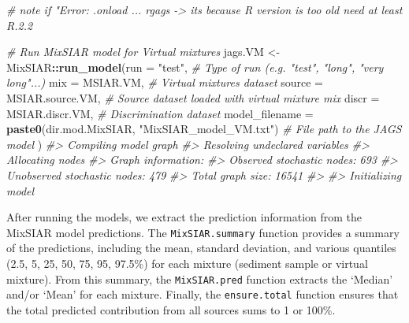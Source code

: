 \documentclass[
]{article}
\newenvironment{Shaded}{\begin{snugshade}}{\end{snugshade}}
\newcommand{\AttributeTok}[1]{\textcolor[rgb]{0.13,0.29,0.53}{#1}}
\newcommand{\CommentTok}[1]{\textcolor[rgb]{0.56,0.35,0.01}{\textit{#1}}}
\newcommand{\FunctionTok}[1]{\textcolor[rgb]{0.13,0.29,0.53}{\textbf{#1}}}
\newcommand{\NormalTok}[1]{#1}
\newcommand{\OtherTok}[1]{\textcolor[rgb]{0.56,0.35,0.01}{#1}}
\newcommand{\SpecialCharTok}[1]{\textcolor[rgb]{0.81,0.36,0.00}{\textbf{#1}}}
\newcommand{\StringTok}[1]{\textcolor[rgb]{0.31,0.60,0.02}{#1}}
\begin{document}
\begin{Shaded}
\begin{Highlighting}[]
\CommentTok{\# note if "Error: .onload ... \textquotesingle{}rgags\textquotesingle{} {-}\textgreater{} it\textquotesingle{}s because R version is too old need at least R.2.2}

\CommentTok{\# Run MixSIAR model for Virtual mixtures}
\NormalTok{jags.VM }\OtherTok{\textless{}{-}}\NormalTok{ MixSIAR}\SpecialCharTok{::}\FunctionTok{run\_model}\NormalTok{(}\AttributeTok{run =} \StringTok{"test"}\NormalTok{,                                                    }\CommentTok{\# Type of run (e.g. "test", "long", "very long"...)}
                              \AttributeTok{mix =}\NormalTok{ MSIAR.VM,                                                  }\CommentTok{\# Virtual mixtures dataset}
                              \AttributeTok{source =}\NormalTok{ MSIAR.source.VM,                                        }\CommentTok{\# Source dataset loaded with virtual mixture mix}
                              \AttributeTok{discr =}\NormalTok{ MSIAR.discr.VM,                                          }\CommentTok{\# Discrimination dataset}
                              \AttributeTok{model\_filename =} \FunctionTok{paste0}\NormalTok{(dir.mod.MixSIAR, }\StringTok{"MixSIAR\_model\_VM.txt"}\NormalTok{) }\CommentTok{\# File path to the JAGS model}
\NormalTok{                              )}
\CommentTok{\#\textgreater{} Compiling model graph}
\CommentTok{\#\textgreater{}    Resolving undeclared variables}
\CommentTok{\#\textgreater{}    Allocating nodes}
\CommentTok{\#\textgreater{} Graph information:}
\CommentTok{\#\textgreater{}    Observed stochastic nodes: 693}
\CommentTok{\#\textgreater{}    Unobserved stochastic nodes: 479}
\CommentTok{\#\textgreater{}    Total graph size: 16541}
\CommentTok{\#\textgreater{} }
\CommentTok{\#\textgreater{} Initializing model}
\end{Highlighting}
\end{Shaded}

After running the models, we extract the prediction information from the
MixSIAR model predictions. The \texttt{MixSIAR.summary} function
provides a summary of the predictions, including the mean, standard
deviation, and various quantiles (2.5, 5, 25, 50, 75, 95, 97.5\%) for
each mixture (sediment sample or virtual mixture). From this summary,
the \texttt{MixSIAR.pred} function extracts the `Median' and/or `Mean'
for each mixture. Finally, the \texttt{ensure.total} function ensures
that the total predicted contribution from all sources sums to 1 or
100\%.
\end{document}
